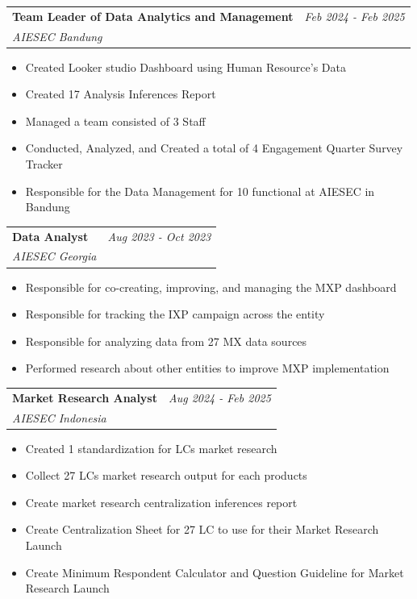 \documentclass[a4paper,11pt]{article}
\makeatletter
\newcommand{\resumeSubheading}[4]{
\vspace{0.5mm}\item
    \begin{tabular*}{0.98\textwidth}[t]{l@{\extracolsep{\fill}}r}
        \textbf{#1} & \textit{\footnotesize{#4}} \\
        \textit{\footnotesize{#3}} &  \footnotesize{#2}\\
    \end{tabular*}
    \vspace{-2.4mm}
}
\newcommand{\resumeItemListStart}{\begin{justify}\begin{itemize}[leftmargin=3ex, rightmargin=2ex, noitemsep,labelsep=1.2mm,itemsep=0mm]\small}
\newcommand{\resumeItemListEnd}{\end{itemize}\end{justify}\vspace{-2mm}}
\makeatother
\begin{document}
      \vspace{-3.0mm}

    \resumeSubheading
      {Team Leader of Data Analytics and Management}{}
      {AIESEC Bandung}{Feb 2024 - Feb 2025}
      \vspace{-2.0mm}
      
      \resumeItemListStart
    \item {Created Looker studio Dashboard using Human Resource's Data}
    \item {Created 17 Analysis Inferences Report}
    \item {Managed a team consisted of 3 Staff}
    \item {Conducted, Analyzed, and Created a total of 4 Engagement Quarter Survey Tracker}
    \item {Responsible for the Data Management for 10 functional at AIESEC in Bandung}
    \resumeItemListEnd
    
    \vspace{-3.0mm}

    \resumeSubheading
      {Data Analyst}{}
      {AIESEC Georgia}{Aug 2023 - Oct 2023}
      \vspace{-2.0mm}
      
      \resumeItemListStart
    \item {Responsible for co-creating, improving, and managing the MXP dashboard}
    \item {Responsible for tracking the IXP campaign across the entity}
    \item {Responsible for analyzing data from 27 MX data sources}
    \item {Performed research about other entities to improve MXP implementation}
    \resumeItemListEnd
    
    \vspace{-3.0mm}

    \resumeSubheading
      {Market Research Analyst}{}
      {AIESEC Indonesia}{Aug 2024 - Feb 2025}
      \vspace{-2.0mm}
      
      \resumeItemListStart
    \item {Created 1 standardization for LCs market research}
    \item {Collect 27 LCs market research output for each products}
    \item {Create market research centralization inferences report}
    \item {Create Centralization Sheet for 27 LC to use for their Market Research Launch}
    \item {Create Minimum Respondent Calculator and Question Guideline for Market Research Launch}
    \resumeItemListEnd
    
\end{document}
